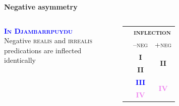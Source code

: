 \documentclass[dvipsnames]{beamer}%
\newcommand{\I}{\textbf{\textcolor{forest}{I}}}
\newcommand{\II}{\textbf{\textcolor{ochre}{II}}}
\newcommand{\III}{\textbf{\textcolor{blue}{III}}}
\newcommand{\IV}{\textbf{\textcolor{violet}{IV}}}
\begin{document}
\begin{frame}{\textbf{Negative asymmetry}}
		\begin{columns}
\textsc{\textbf{\textcolor{Blue}{In Djambarrpuyŋu}}}\\Negative \textsc{realis} and \textsc{irrealis} predications are inflected identically

	\begin{tabular}{ccc}
	&\multicolumn{2}{c}{\textsc{\textbf{inflection}}} \\
	& \textsc{--neg} & \textsc{+neg}\\\midrule
	&	\I & \multirow{2}{*}{\II}\\
	& \II \\\midrule
	&	\III & \multirow{2}{*}{\IV}\\
	& \IV \\\bottomrule
\end{tabular}
		\end{columns}
\end{frame}

%
%
%
\end{document}

